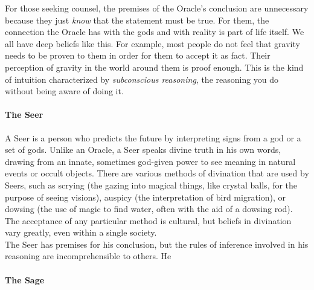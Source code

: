 For those seeking counsel, the premises of the Oracle's conclusion are unnecessary because they just \textit{know} that the statement must be true. For them, the connection the Oracle has with the gods and with reality is part of life itself. We all have deep beliefs like this. For example, most people do not feel that gravity needs to be proven to them in order for them to accept it as fact. Their perception of gravity in the world around them is proof enough. This is the kind of intuition characterized by \textit{subconscious reasoning}, the reasoning you do without being aware of doing it. \\

\paragraph{The Seer} \hspace*{1mm} \vspace*{2mm}

A Seer is a person who predicts the future by interpreting signs from a god or a set of gods. Unlike an Oracle, a Seer speaks divine truth in his own words, drawing from an innate, sometimes god-given power to see meaning in natural events or occult objects. There are various methods of divination that are used by Seers, such as scrying (the gazing into magical things, like crystal balls, for the purpose of seeing visions), auspicy (the interpretation of bird migration), or dowsing (the use of magic to find water, often with the aid of a dowsing rod). The acceptance of any particular method is cultural, but beliefs in divination vary greatly, even within a single society. \\

The Seer has premises for his conclusion, but the rules of inference involved in his reasoning are incomprehensible to others. He 

\paragraph{The Sage} \hspace*{1mm} \vspace*{2mm}


